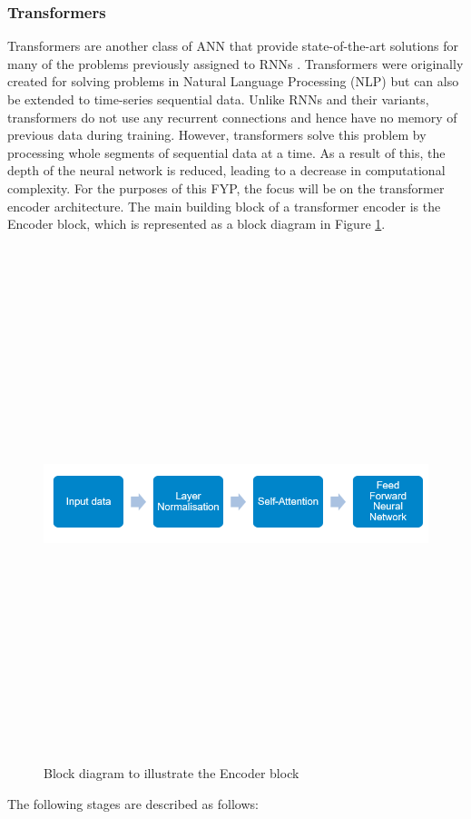\subsubsection{Transformers}

Transformers are another class of ANN that provide state-of-the-art solutions 
for many of the problems previously assigned to RNNs \cite{transformers}. Transformers 
were originally created for solving problems in Natural Language Processing (NLP) but can 
also be extended to time-series sequential data. Unlike RNNs and their variants, transformers do not 
use any recurrent connections and hence have no memory of previous data during training. However, transformers solve this problem 
by processing whole segments of sequential data at a time. As a result of this, the depth of the neural network is reduced, leading to 
a decrease in computational complexity. For the purposes of this FYP, the focus will be on the transformer encoder 
architecture. The main building block of a transformer encoder is the Encoder block, which is represented as a block diagram in Figure \ref{transformer}.
\begin{figure}[H]
    \centering
    \includegraphics[width=15cm,height=15cm,keepaspectratio]{Background/transformer.png}
    \caption{Block diagram to illustrate the Encoder block \cite{transformers}}
    \label{transformer}
\end{figure}\noindent The following stages are described as follows:

